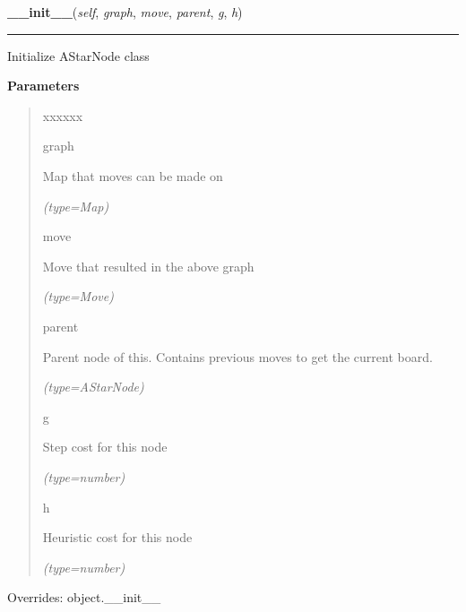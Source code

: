 \hspace{.8\funcindent}\begin{boxedminipage}{\funcwidth}

    \raggedright \textbf{\_\_init\_\_}(\textit{self}, \textit{graph}, \textit{move}, \textit{parent}, \textit{g}, \textit{h})

    \vspace{-1.5ex}

    \rule{\textwidth}{0.5\fboxrule}
\setlength{\parskip}{2ex}
    Initialize AStarNode class

\setlength{\parskip}{1ex}
      \textbf{Parameters}
      \vspace{-1ex}

      \begin{quote}
        \begin{Ventry}{xxxxxx}

          \item[graph]

          Map that moves can be made on

            {\it (type=Map)}

          \item[move]

          Move that resulted in the above graph

            {\it (type=Move)}

          \item[parent]

          Parent node of this. Contains previous moves to get the current 
          board.

            {\it (type=AStarNode)}

          \item[g]

          Step cost for this node

            {\it (type=number)}

          \item[h]

          Heuristic cost for this node

            {\it (type=number)}

        \end{Ventry}

      \end{quote}

      Overrides: object.\_\_init\_\_

    \end{boxedminipage}

